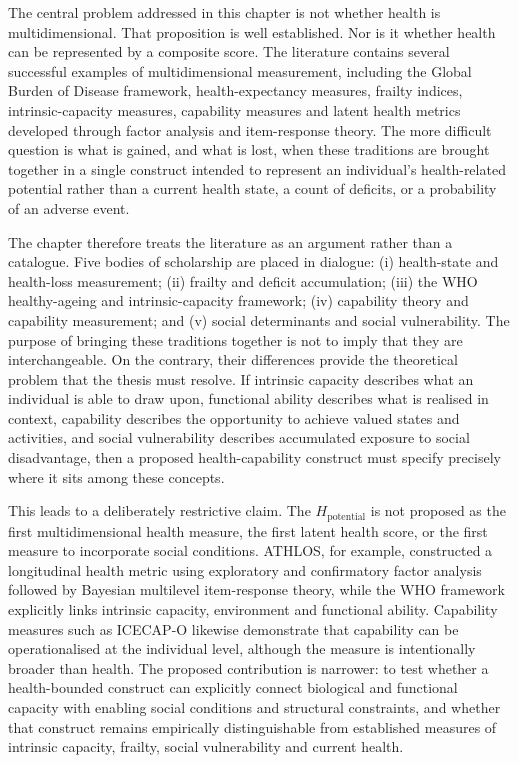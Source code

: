 \label{ch:theory}

\noindent
The central problem addressed in this chapter is not whether health is multidimensional. That proposition is well established. Nor is it whether health can be represented by a composite score. The literature contains several successful examples of multidimensional measurement, including the Global Burden of Disease framework, health-expectancy measures, frailty indices, intrinsic-capacity measures, capability measures and latent health metrics developed through factor analysis and item-response theory. The more difficult question is what is gained, and what is lost, when these traditions are brought together in a single construct intended to represent an individual's health-related potential rather than a current health state, a count of deficits, or a probability of an adverse event.

The chapter therefore treats the literature as an argument rather than a catalogue. Five bodies of scholarship are placed in dialogue: (i) health-state and health-loss measurement; (ii) frailty and deficit accumulation; (iii) the WHO healthy-ageing and intrinsic-capacity framework; (iv) capability theory and capability measurement; and (v) social determinants and social vulnerability. The purpose of bringing these traditions together is not to imply that they are interchangeable. On the contrary, their differences provide the theoretical problem that the thesis must resolve. If intrinsic capacity describes what an individual is able to draw upon, functional ability describes what is realised in context, capability describes the opportunity to achieve valued states and activities, and social vulnerability describes accumulated exposure to social disadvantage, then a proposed health-capability construct must specify precisely where it sits among these concepts.

This leads to a deliberately restrictive claim. The $H_{\text{potential}}$ is not proposed as the first multidimensional health measure, the first latent health score, or the first measure to incorporate social conditions. ATHLOS, for example, constructed a longitudinal health metric using exploratory and confirmatory factor analysis followed by Bayesian multilevel item-response theory, while the WHO framework explicitly links intrinsic capacity, environment and functional ability. \cite{caballero_athlos_2017,who_2015_ageing,who_healthy_ageing_2026} Capability measures such as ICECAP-O likewise demonstrate that capability can be operationalised at the individual level, although the measure is intentionally broader than health. \cite{icecap_o,icecap_o_validation} The proposed contribution is narrower: to test whether a health-bounded construct can explicitly connect biological and functional capacity with enabling social conditions and structural constraints, and whether that construct remains empirically distinguishable from established measures of intrinsic capacity, frailty, social vulnerability and current health.

